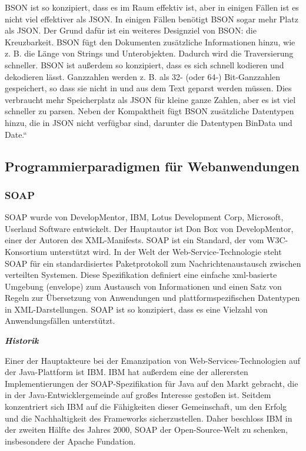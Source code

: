 BSON ist so konzipiert, dass es im Raum effektiv ist, aber in einigen Fällen ist es nicht viel effektiver als JSON. In einigen Fällen benötigt BSON sogar mehr Platz als JSON. Der Grund dafür ist ein weiteres Designziel von BSON: die Kreuzbarkeit. BSON fügt den Dokumenten zusätzliche Informationen hinzu, wie z. B. die Länge von Strings und Unterobjekten. Dadurch wird die Traversierung schneller.\cite{bson} BSON ist außerdem so konzipiert, dass es sich schnell kodieren und dekodieren lässt. Ganzzahlen werden z. B. als 32- (oder 64-) Bit-Ganzzahlen gespeichert, so dass sie nicht in und aus dem Text geparst werden müssen. Dies verbraucht mehr Speicherplatz als JSON für kleine ganze Zahlen, aber es ist viel schneller zu parsen. Neben der Kompaktheit fügt BSON zusätzliche Datentypen hinzu, die in JSON nicht verfügbar sind, darunter die Datentypen BinData und Date.“
\subsection{Programmierparadigmen für Webanwendungen}
\subsubsection{SOAP}
\ac{SOAP} wurde von DevelopMentor, IBM, Lotus Development Corp, Microsoft, Userland Software entwickelt. Der Hauptautor ist Don Box von DevelopMentor, einer der Autoren des XML-Manifests. SOAP ist ein Standard, der vom W3C-Konsortium unterstützt wird. In der Welt der Web-Service-Technologie steht SOAP für ein standardisiertes Paketprotokoll zum Nachrichtenaustausch zwischen verteilten Systemen. Diese Spezifikation definiert eine einfache xml-basierte Umgebung (envelope) zum Austausch von Informationen und einen Satz von Regeln zur Übersetzung von Anwendungen und plattformspezifischen Datentypen in XML-Darstellungen. SOAP ist so konzipiert, dass es eine Vielzahl von Anwendungsfällen unterstützt.\cite{saop1}

\textit{\textbf{Historik}}

Einer der Hauptakteure bei der Emanzipation von Web-Services-Technologien auf der Java-Plattform ist \ac{IBM}. IBM hat außerdem eine der allerersten Implementierungen der SOAP-Spezifikation für Java auf den Markt gebracht, die in der Java-Entwicklergemeinde auf großes Interesse gestoßen ist. Seitdem konzentriert sich IBM auf die Fähigkeiten dieser Gemeinschaft, um den Erfolg und die Nachhaltigkeit des Frameworks sicherzustellen. Daher beschloss IBM in der zweiten Hälfte des Jahres 2000, SOAP der Open-Source-Welt zu schenken, insbesondere der Apache Fundation.

